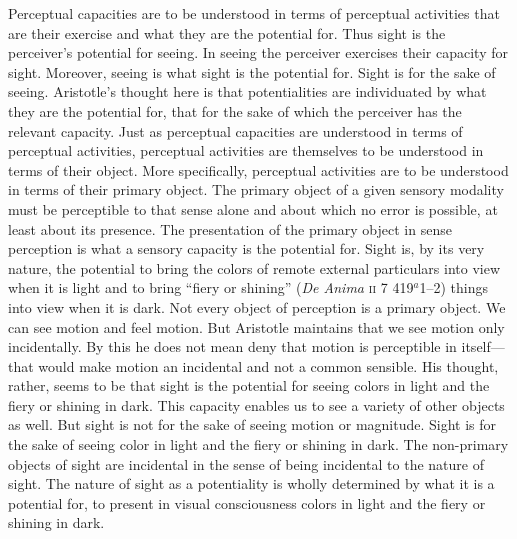 Perceptual capacities are to be understood in terms of perceptual activities that are their exercise and what they are the potential for. Thus sight is the perceiver's potential for seeing. In seeing the perceiver exercises their capacity for sight. Moreover, seeing is what sight is the potential for. Sight is for the sake of seeing. Aristotle's thought here is that potentialities are individuated by what they are the potential for, that for the sake of which the perceiver has the relevant capacity. Just as perceptual capacities are understood in terms of perceptual activities, perceptual activities are themselves to be understood in terms of their object. More specifically, perceptual activities are to be understood in terms of their primary object. The primary object of a given sensory modality must be perceptible to that sense alone and about which no error is possible, at least about its presence. The presentation of the primary object in sense perception is what a sensory capacity is the potential for. Sight is, by its very nature, the potential to bring the colors of remote external particulars into view when it is light and to bring ``fiery or shining'' (\emph{De Anima} \textsc{ii} 7 419\( ^{a} \)1--2) things into view when it is dark. Not every object of perception is a primary object. We can see motion and feel motion. But Aristotle maintains that we see motion only incidentally. By this he does not mean deny that motion is perceptible in itself---that would make motion an incidental and not a common sensible. His thought, rather, seems to be that sight is the potential for seeing colors in light and the fiery or shining in dark. This capacity enables us to see a variety of other objects as well. But sight is not for the sake of seeing motion or magnitude. Sight is for the sake of seeing color in light and the fiery or shining in dark. The non-primary objects of sight are incidental in the sense of being incidental to the nature of sight. The nature of sight as a potentiality is wholly determined by what it is a potential for, to present in visual consciousness colors in light and the fiery or shining in dark.

